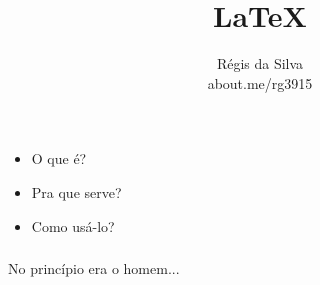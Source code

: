 \documentclass[aspectratio=169]{beamer}
\title{\Huge \LaTeX}
\author{R\'egis da Silva\\ {\texorpdfstring{\color{blue}}{ }about.me/rg3915}}
\institute{\Large {\texorpdfstring{\color{blue}}{ }latexbr.blogspot.com.br}}
\date{}
\begin{document}
\justifying %

{%

  \begin{frame}
  \end{frame}
}

\begin{frame}\frametitle{}
\begin{itemize}
  \item<1-> \Huge O que é?
  \item<2-> \Huge Pra que serve?
  \item<3-> \Huge Como usá-lo?
\end{itemize}
\end{frame}

\begin{frame}\frametitle{}
  \begin{center}
    \Huge No princípio era o homem...
  \end{center}
\end{frame}

{%

  \begin{frame}
    \begin{center}
      \vspace{.7\paperheight}
      \Huge \color{white}{E o homem era Donald Knuth.}
    \end{center}
  \end{frame}
}
\end{document}
